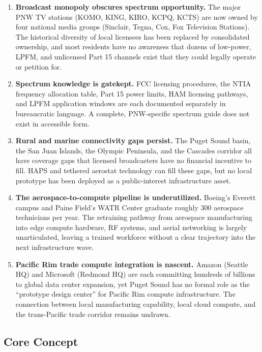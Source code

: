 \documentclass[11pt,letterpaper]{article}
\begin{document}
\begin{enumerate}
  \item \textbf{Broadcast monopoly obscures spectrum opportunity.} The major PNW TV stations (KOMO, KING, KIRO, KCPQ, KCTS) are now owned by four national media groups (Sinclair, Tegna, Cox, Fox Television Stations). The historical diversity of local licensees has been replaced by consolidated ownership, and most residents have no awareness that dozens of low-power, LPFM, and unlicensed Part 15 channels exist that they could legally operate or petition for.

  \item \textbf{Spectrum knowledge is gatekept.} FCC licensing procedures, the NTIA frequency allocation table, Part 15 power limits, HAM licensing pathways, and LPFM application windows are each documented separately in bureaucratic language. A complete, PNW-specific spectrum guide does not exist in accessible form.

  \item \textbf{Rural and marine connectivity gaps persist.} The Puget Sound basin, the San Juan Islands, the Olympic Peninsula, and the Cascades corridor all have coverage gaps that licensed broadcasters have no financial incentive to fill. HAPS and tethered aerostat technology can fill these gaps, but no local prototype has been deployed as a public-interest infrastructure asset.

  \item \textbf{The aerospace-to-compute pipeline is underutilized.} Boeing's Everett campus and Paine Field's WATR Center graduate roughly 300 aerospace technicians per year. The retraining pathway from aerospace manufacturing into edge compute hardware, RF systems, and aerial networking is largely unarticulated, leaving a trained workforce without a clear trajectory into the next infrastructure wave.

  \item \textbf{Pacific Rim trade compute integration is nascent.} Amazon (Seattle HQ) and Microsoft (Redmond HQ) are each committing hundreds of billions to global data center expansion, yet Puget Sound has no formal role as the ``prototype design center'' for Pacific Rim compute infrastructure. The connection between local manufacturing capability, local cloud compute, and the trans-Pacific trade corridor remains undrawn.
\end{enumerate}

\subsection{Core Concept}
\end{document}
